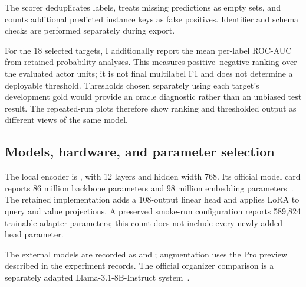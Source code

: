 \documentclass[12pt,a4paper]{article}
\begin{document}
The scorer deduplicates labels, treats missing predictions as empty sets, and counts additional predicted instance keys as false positives. Identifier and schema checks are performed separately during export.

For the 18 selected targets, I additionally report the mean per-label ROC-AUC from retained probability analyses. This measures positive--negative ranking over the evaluated actor units; it is not final multilabel F1 and does not determine a deployable threshold. Thresholds chosen separately using each target's development gold would provide an oracle diagnostic rather than an unbiased test result. The repeated-run plots therefore show ranking and thresholded output as different views of the same model.

\subsection{Models, hardware, and parameter selection}
The local encoder is , with 12 layers and hidden width 768. Its official model card reports 86 million backbone parameters and 98 million embedding parameters~\cite{debertacard}. The retained implementation adds a 108-output linear head and applies LoRA to query and value projections. A preserved smoke-run configuration reports 589,824 trainable adapter parameters; this count does not include every newly added head parameter.

The external models are recorded as  and ; augmentation uses the Pro preview described in the experiment records. The official organizer comparison is a separately adapted Llama-3.1-8B-Instruct system~\cite{fehuoverview}.
\end{document}
